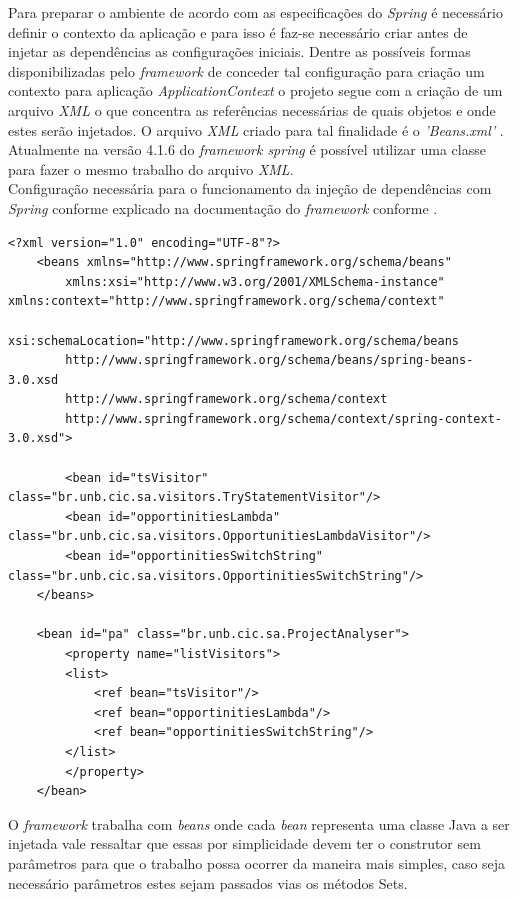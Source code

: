 Para preparar o ambiente de acordo com as especificações do {\it Spring} é necessário definir o contexto da aplicação e para isso é faz-se necessário criar antes de injetar as dependências as configurações iniciais. Dentre as possíveis formas disponibilizadas pelo {\it framework} de conceder tal configuração para criação um contexto para aplicação \textit{ApplicationContext} o projeto segue com a criação de um arquivo \textit{XML} o que concentra as referências necessárias de quais objetos e onde estes serão injetados. O arquivo \textit{XML} criado para tal finalidade é o \textit{'Beans.xml'} . Atualmente na versão 4.1.6 do {\it framework spring} é possível utilizar uma classe para fazer o mesmo trabalho do arquivo \textit{XML}. \\



Configuração necessária para o funcionamento da injeção de dependências com {\it Spring} conforme explicado na documentação do {\it framework} conforme \cite{SPRING_REF}.\\
\begin{lstlisting}
<?xml version="1.0" encoding="UTF-8"?>
	<beans xmlns="http://www.springframework.org/schema/beans"
		xmlns:xsi="http://www.w3.org/2001/XMLSchema-instance" xmlns:context="http://www.springframework.org/schema/context"
		xsi:schemaLocation="http://www.springframework.org/schema/beans 
		http://www.springframework.org/schema/beans/spring-beans-3.0.xsd
		http://www.springframework.org/schema/context 
		http://www.springframework.org/schema/context/spring-context-3.0.xsd">

		<bean id="tsVisitor" class="br.unb.cic.sa.visitors.TryStatementVisitor"/>
		<bean id="opportinitiesLambda" class="br.unb.cic.sa.visitors.OpportunitiesLambdaVisitor"/>
		<bean id="opportinitiesSwitchString" class="br.unb.cic.sa.visitors.OpportinitiesSwitchString"/>
	</beans>
	
	<bean id="pa" class="br.unb.cic.sa.ProjectAnalyser">
		<property name="listVisitors">
		<list>
			<ref bean="tsVisitor"/>
			<ref bean="opportinitiesLambda"/>
			<ref bean="opportinitiesSwitchString"/>
		</list>
		</property>
	</bean>
\end{lstlisting}


O {\it framework} trabalha com \textit{beans} onde cada \textit{bean} representa uma classe Java a ser injetada vale ressaltar que essas por simplicidade devem ter o construtor sem parâmetros para que o trabalho possa ocorrer da maneira mais simples, caso seja necessário parâmetros estes sejam passados vias os métodos Sets.\\

